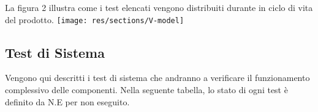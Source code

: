 	La figura 2 illustra come i test elencati vengono distribuiti durante in ciclo di vita del prodotto.
	\texttt{[image: res/sections/V-model]}

\subsection{Test di Sistema}
	Vengono qui descritti i test di sistema che andranno a verificare il funzionamento complessivo delle componenti. Nella seguente tabella, lo stato di ogni test è definito da N.E per non eseguito.

	
	
	
	
	
